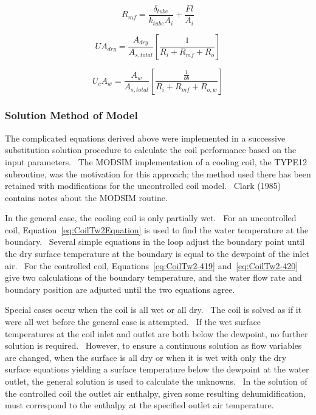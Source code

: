 \begin{equation}
{R_{mf}} = \frac{{{\delta_{tube}}}}{{{k_{tube}}{A_i}}} + \frac{{Fl}}{{{A_i}}}
\label{eq:CoilRmf}
\end{equation}

\begin{equation}
U{A_{dry}} = \frac{{{A_{dry}}}}{{{A_{s,total}}}}\left[ {\frac{1}{{{R_i} + {R_{mf}} + {R_o}}}} \right]
\label{eq:CoilUAdry}
\end{equation}

\begin{equation}
{U_c}{A_w} = \frac{{{A_w}}}{{{A_{s,total}}}}\left[ {\frac{{{\frac{1}{bb}}}}{{{R_i} + {R_{mf}} + {R_{o,w}}}}} \right]
\label{eq:CoilUcAw}
\end{equation}

\subsubsection{Solution Method of Model}\label{solution-method-of-model}

The complicated equations derived above were implemented in a successive substitution solution procedure to calculate the coil performance based on the input parameters.~ The MODSIM implementation of a cooling coil, the TYPE12 subroutine, was the motivation for this approach; the method used there has been retained with modifications for the uncontrolled coil model.~ Clark (1985) contains notes about the MODSIM routine.

In the general case, the cooling coil is only partially wet.~ For an uncontrolled coil, Equation~\ref{eq:CoilTw2Equation} is used to find the water temperature at the boundary.~ Several simple equations in the loop adjust the boundary point until the dry surface temperature at the boundary is equal to the dewpoint of the inlet air.~ For the controlled coil, Equations~\ref{eq:CoilTw2-419} and~\ref{eq:CoilTw2-420} give two calculations of the boundary temperature, and the water flow rate and boundary position are adjusted until the two equations agree.

Special cases occur when the coil is all wet or all dry.~ The coil is solved as if it were all wet before the general case is attempted.~ If the wet surface temperatures at the coil inlet and outlet are both below the dewpoint, no further solution is required.~ However, to ensure a continuous solution as flow variables are changed, when the surface is all dry or when it is wet with only the dry surface equations yielding a surface temperature below the dewpoint at the water outlet, the general solution is used to calculate the unknowns.~ In the solution of the controlled coil the outlet air enthalpy, given some resulting dehumidification, must correspond to the enthalpy at the specified outlet air temperature.

